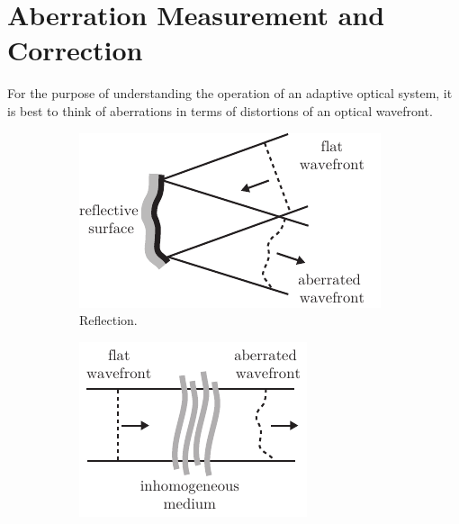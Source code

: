 \section{Aberration Measurement and Correction}



For the purpose of understanding the operation of an adaptive optical system, it is best to think of aberrations in terms of distortions of an optical wavefront.

\begin{figure}[tbh]
        \centering
        \begin{subfigure}[b]{0.4\textwidth}
                \includegraphics[width=\textwidth]{images/wavefront_distortions_reflection}
                \caption{Reflection.}
                \label{fig:abberation_reflection}
        \end{subfigure}
				\hspace{1em}
        \begin{subfigure}[b]{0.3\textwidth}
                \includegraphics[width=\textwidth]{images/wavefront_distortions_transmission}

\end{subfigure}
\end{figure}
